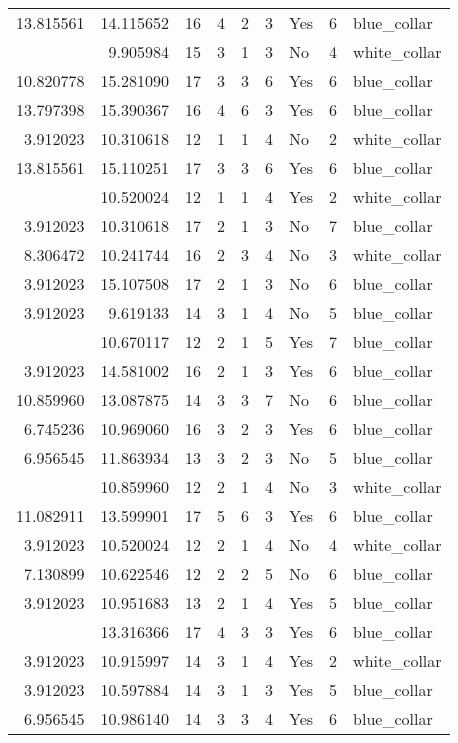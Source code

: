 \documentclass[
]{article}
\begin{document}
\begin{longtable}[t]{rrrrrllrl}
13.815561 & 14.115652 & 16 & 4 & 2 & 3 & Yes & 6 & blue\_collar\\
\addlinespace
3.912023 & 9.905984 & 15 & 3 & 1 & 3 & No & 4 & white\_collar\\
10.820778 & 15.281090 & 17 & 3 & 3 & 6 & Yes & 6 & blue\_collar\\
13.797398 & 15.390367 & 16 & 4 & 6 & 3 & Yes & 6 & blue\_collar\\
3.912023 & 10.310618 & 12 & 1 & 1 & 4 & No & 2 & white\_collar\\
13.815561 & 15.110251 & 17 & 3 & 3 & 6 & Yes & 6 & blue\_collar\\
\addlinespace
3.912023 & 10.520024 & 12 & 1 & 1 & 4 & Yes & 2 & white\_collar\\
3.912023 & 10.310618 & 17 & 2 & 1 & 3 & No & 7 & blue\_collar\\
8.306472 & 10.241744 & 16 & 2 & 3 & 4 & No & 3 & white\_collar\\
3.912023 & 15.107508 & 17 & 2 & 1 & 3 & No & 6 & blue\_collar\\
3.912023 & 9.619133 & 14 & 3 & 1 & 4 & No & 5 & blue\_collar\\
\addlinespace
3.912023 & 10.670117 & 12 & 2 & 1 & 5 & Yes & 7 & blue\_collar\\
3.912023 & 14.581002 & 16 & 2 & 1 & 3 & Yes & 6 & blue\_collar\\
10.859960 & 13.087875 & 14 & 3 & 3 & 7 & No & 6 & blue\_collar\\
6.745236 & 10.969060 & 16 & 3 & 2 & 3 & Yes & 6 & blue\_collar\\
6.956545 & 11.863934 & 13 & 3 & 2 & 3 & No & 5 & blue\_collar\\
\addlinespace
3.912023 & 10.859960 & 12 & 2 & 1 & 4 & No & 3 & white\_collar\\
11.082911 & 13.599901 & 17 & 5 & 6 & 3 & Yes & 6 & blue\_collar\\
3.912023 & 10.520024 & 12 & 2 & 1 & 4 & No & 4 & white\_collar\\
7.130899 & 10.622546 & 12 & 2 & 2 & 5 & No & 6 & blue\_collar\\
3.912023 & 10.951683 & 13 & 2 & 1 & 4 & Yes & 5 & blue\_collar\\
\addlinespace
10.820778 & 13.316366 & 17 & 4 & 3 & 3 & Yes & 6 & blue\_collar\\
3.912023 & 10.915997 & 14 & 3 & 1 & 4 & Yes & 2 & white\_collar\\
3.912023 & 10.597884 & 14 & 3 & 1 & 3 & Yes & 5 & blue\_collar\\
6.956545 & 10.986140 & 14 & 3 & 3 & 4 & Yes & 6 & blue\_collar\\

\end{longtable}
\end{document}

